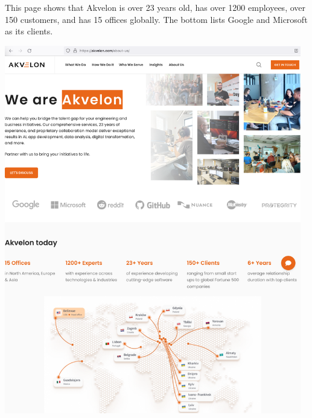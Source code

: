 
This page shows that Akvelon is over 23 years old,
has over 1200 employees, over 150 customers,
and has 15 offices globally.
The bottom lists Google and Microsoft as its clients.

\begin{center}
    \includegraphics[width=35em]{akvelon-about-p1}
\end{center}
\WillContinue
\pagebreak

